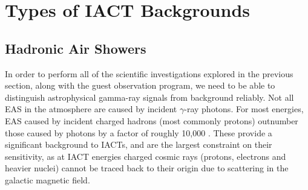 \section{Types of IACT Backgrounds}
\subsection{Hadronic Air Showers}

In order to perform all of the scientific investigations explored in the previous section, along with the guest observation program, we need to be able to distinguish astrophysical gamma-ray signals from background reliably. Not all EAS in the atmosphere are caused by incident $\gamma$-ray photons. For most energies, EAS caused by incident charged hadrons (most commonly protons) outnumber those caused by photons by a factor of roughly 10,000 \cite{Benbow}. These provide a significant background to IACTs, and are the largest constraint on their sensitivity, as at IACT energies charged cosmic rays (protons, electrons and heavier nuclei) cannot be traced back to their origin due to scattering in the galactic magnetic field.

